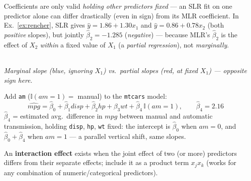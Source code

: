 \begin{remark}
    Coefficients are only valid \emph{holding other predictors fixed}
    --- an SLR fit on one predictor alone can differ drastically
    (even in sign) from its MLR coefficient. In Ex.\ \ref{ex:rencher},
    SLR gives $\hat y=1.86+1.30x_1$ and $\hat y=0.86+0.78x_2$ (both
    \emph{positive} slopes), but jointly $\hat\beta_2=-1.285$
    (\emph{negative}) --- because MLR's $\hat\beta_2$ is the effect of
    $X_2$ \emph{within} a fixed value of $X_1$ (a \emph{partial
    regression}), not \emph{marginally}. 
\end{remark}

\begin{center}
    \\[2pt] \textit{\small Marginal slope (blue, ignoring $X_1$) vs.\ partial slopes (red, at fixed $X_1$) --- opposite sign here.}
\end{center}

\begin{example}
    Add \texttt{am} ($\mathbb{I}(am=1)=$ manual) to the \texttt{mtcars}
    model:
    \[\widehat{mpg}=\hat\beta_0+\hat\beta_1disp+\hat\beta_2hp+\hat\beta_3wt+\hat\beta_4\,\mathbb{I}(am=1),
    \qquad \hat\beta_4=2.16\]
    $\hat\beta_4$ = estimated avg.\ difference in $mpg$ between manual
    and automatic transmission, holding \texttt{disp}, \texttt{hp},
    \texttt{wt} fixed: the intercept is $\hat\beta_0$ when $am=0$, and
    $\hat\beta_0+\hat\beta_4$ when $am=1$ --- a parallel vertical shift,
    same slopes.
\end{example}

\begin{definition}[Interaction]\label{def:interaction}
    An \textbf{interaction effect} exists when the joint effect of two
    (or more) predictors differs from their separate effects; include
    it as a product term $x_jx_k$ (works for any combination of
    numeric/categorical predictors). 
\end{definition}


